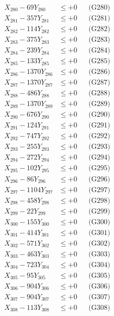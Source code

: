 \documentclass[a4paper,10pt]{article}
\begin{document}
{\begin{align}
X_{280} - 69Y_{280} &\leq +0 && \text{(G280)} \\
\allowbreak
X_{281} - 357Y_{281} &\leq +0 && \text{(G281)} \\
X_{282} - 114Y_{282} &\leq +0 && \text{(G282)} \\
X_{283} - 375Y_{283} &\leq +0 && \text{(G283)} \\
X_{284} - 239Y_{284} &\leq +0 && \text{(G284)} \\
X_{285} - 133Y_{285} &\leq +0 && \text{(G285)} \\
X_{286} - 1370Y_{286} &\leq +0 && \text{(G286)} \\
X_{287} - 1370Y_{287} &\leq +0 && \text{(G287)} \\
X_{288} - 486Y_{288} &\leq +0 && \text{(G288)} \\
X_{289} - 1370Y_{289} &\leq +0 && \text{(G289)} \\
X_{290} - 676Y_{290} &\leq +0 && \text{(G290)} \\
\allowbreak
X_{291} - 124Y_{291} &\leq +0 && \text{(G291)} \\
X_{292} - 747Y_{292} &\leq +0 && \text{(G292)} \\
X_{293} - 255Y_{293} &\leq +0 && \text{(G293)} \\
X_{294} - 272Y_{294} &\leq +0 && \text{(G294)} \\
X_{295} - 102Y_{295} &\leq +0 && \text{(G295)} \\
X_{296} - 86Y_{296} &\leq +0 && \text{(G296)} \\
X_{297} - 1104Y_{297} &\leq +0 && \text{(G297)} \\
X_{298} - 458Y_{298} &\leq +0 && \text{(G298)} \\
X_{299} - 22Y_{299} &\leq +0 && \text{(G299)} \\
X_{300} - 155Y_{300} &\leq +0 && \text{(G300)} \\
\allowbreak
X_{301} - 414Y_{301} &\leq +0 && \text{(G301)} \\
X_{302} - 571Y_{302} &\leq +0 && \text{(G302)} \\
X_{303} - 463Y_{303} &\leq +0 && \text{(G303)} \\
X_{304} - 723Y_{304} &\leq +0 && \text{(G304)} \\
X_{305} - 95Y_{305} &\leq +0 && \text{(G305)} \\
X_{306} - 904Y_{306} &\leq +0 && \text{(G306)} \\
X_{307} - 904Y_{307} &\leq +0 && \text{(G307)} \\
X_{308} - 113Y_{308} &\leq +0 && \text{(G308)} \\

\end{align}}
\end{document}
